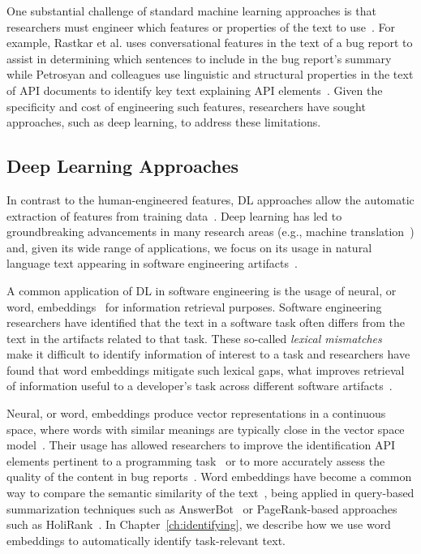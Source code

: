 One substantial challenge of standard machine learning
approaches is that researchers must engineer which 
features or properties of the text to use~\cite{ferreira2021}.
For example, Rastkar et al. uses conversational features in 
the text of a bug report to assist in determining which sentences 
to include in the bug report's summary~\cite{Rastkar2010}
while Petrosyan and colleagues use 
linguistic and structural properties 
in the text of API documents to identify key text 
explaining API elements~\cite{Petrosyan2015}.
Given the specificity and cost of engineering such features, 
researchers have sought approaches, such as deep learning, to address these 
limitations. 






\subsection{Deep Learning Approaches}
\label{cp2:deep-learning}





In contrast to the human-engineered features,
\acf{DL} approaches allow the automatic extraction of features 
from training data~\cite{Deng2018, zhang2021deep}.
Deep learning has led to groundbreaking advancements in many 
research areas (e.g., machine translation~\cite{lopez2008translation}) 
and, given its wide range of applications, 
we focus
on its usage in natural language text appearing in software engineering artifacts~\cite{ferreira2021, li2018deep, watson2022}.






A common application of \acs{DL} in software engineering is the usage of neural, or word, embeddings~\cite{Mikolov2013}
for information retrieval purposes. 
Software engineering researchers have identified that the text 
in a software task 
often differs from the text in the artifacts related to that task. 
These so-called \textit{lexical mismatches}~\cite{Ye2016, Huang2018} 
 make it difficult to identify information of interest 
to a task and researchers have found that word
embeddings mitigate such lexical gaps,
what improves retrieval of information useful to a developer's task
across different software artifacts~\cite{Ye2016}. 


Neural, or word, embeddings produce vector representations in a continuous space,
where words with similar meanings are typically close in the vector space model~\cite{harris1954distributional, mikolov2013efficient}. 
Their usage has allowed researchers to improve 
the identification API elements pertinent to a programming task~\cite{Ye2016} 
or to more accurately assess the quality of the content in bug reports~\cite{chaparro2019}.
Word embeddings have become a common way 
to compare the semantic similarity of the text~\cite{mihalcea2006},
being applied in query-based summarization techniques such as 
AnswerBot~\cite{Xu2017}
or PageRank-based approaches such as HoliRank~\cite{Ponzanelli2017}.
In Chapter~\ref{ch:identifying}, we describe how we use 
word embeddings to automatically identify task-relevant text.



